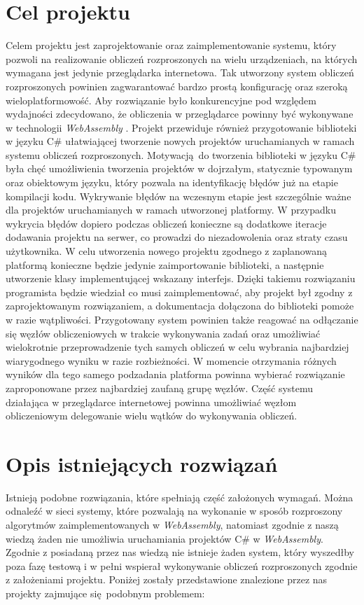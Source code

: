 \documentclass[a4paper,11pt,twoside]{report}
\theoremstyle{definition}
\begin{document}
    \section{Cel projektu}
        Celem projektu jest zaprojektowanie oraz zaimplementowanie systemu, który pozwoli na realizowanie obliczeń rozproszonych na wielu urządzeniach, na których wymagana jest jedynie przeglądarka internetowa.
        Tak utworzony system obliczeń rozproszonych powinien zagwarantować bardzo prostą konfigurację oraz szeroką wieloplatformowość.
        Aby rozwiązanie było konkurencyjne pod względem wydajności zdecydowano, że obliczenia w przeglądarce powinny być wykonywane w technologii \textit{WebAssembly} \cite{webassembly}.
        Projekt przewiduje również przygotowanie biblioteki w języku C\# ułatwiającej tworzenie nowych projektów uruchamianych w ramach systemu obliczeń rozproszonych. 
        Motywacją do tworzenia biblioteki w języku C\# była chęć umożliwienia tworzenia projektów w dojrzałym, statycznie typowanym oraz obiektowym języku, który pozwala na identyfikację błędów już na etapie kompilacji kodu. 
        Wykrywanie błędów na wczesnym etapie jest szczególnie ważne dla projektów uruchamianych w ramach utworzonej platformy.
        W przypadku wykrycia błędów dopiero podczas obliczeń konieczne są dodatkowe iteracje dodawania projektu na serwer, co prowadzi do niezadowolenia oraz straty czasu użytkownika.
        W celu utworzenia nowego projektu zgodnego z zaplanowaną platformą konieczne będzie jedynie zaimportowanie biblioteki, a następnie utworzenie klasy implementującej wskazany interfejs.
        Dzięki takiemu rozwiązaniu programista będzie wiedział co musi zaimplementować, aby projekt był zgodny z zaprojektowanym rozwiązaniem, a dokumentacja dołączona do biblioteki pomoże w razie wątpliwości.
        Przygotowany system powinien także reagować na odłączanie się węzłów obliczeniowych w trakcie wykonywania zadań oraz umożliwiać wielokrotnie przeprowadzenie tych samych obliczeń w celu wybrania najbardziej wiarygodnego wyniku w razie rozbieżności.
        W momencie otrzymania różnych wyników dla tego samego podzadania platforma powinna wybierać rozwiązanie zaproponowane przez najbardziej zaufaną grupę węzłów.
        Część systemu działająca w przeglądarce internetowej powinna umożliwiać węzłom obliczeniowym delegowanie wielu wątków do wykonywania obliczeń.
    
    \section{Opis istniejących rozwiązań}
        Istnieją podobne rozwiązania, które spełniają część założonych wymagań.
        Można odnaleźć w sieci systemy, które pozwalają na wykonanie w sposób rozproszony algorytmów  zaimplementowanych w \textit{WebAssembly}, natomiast zgodnie z naszą wiedzą żaden nie umożliwia uruchamiania projektów C\# w \textit{WebAssembly}.
        Zgodnie z posiadaną przez nas wiedzą nie istnieje żaden system, który wyszedłby poza fazę testową i w pełni wspierał wykonywanie obliczeń rozproszonych zgodnie z założeniami projektu.
        Poniżej zostały przedstawione znalezione przez nas projekty zajmujące się podobnym problemem:
        
\end{document}
